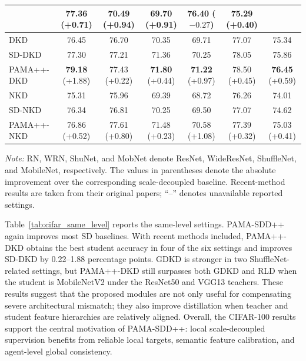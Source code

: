 \documentclass[a4paper,fleqn]{cas-dc}
\begin{document}
\begin{table}[pos=t]
{\begin{tabular}{lcccccc}
         & 77.36 {\scriptsize (+0.71)} 
         & 70.49 {\scriptsize (+0.94)} 
         & 69.70 {\scriptsize (+0.91)} 
         & 76.40 {\scriptsize ($-0.27$)} 
         & 75.29 {\scriptsize (+0.40)} \\
\midrule
DKD~\cite{zhao2022decoupled}      & 76.45 & 76.70 & 70.35 & 69.71 & 77.07 & 75.34 \\
SD-DKD~\cite{wei2024scaled}   & 77.30 & 77.21 & 71.36 & 70.25 & 78.05 & 75.86 \\
PAMA++-DKD & \textbf{79.18} {\scriptsize (+1.88)} 
         & 77.43 {\scriptsize (+0.22)} 
         & \textbf{71.80} {\scriptsize (+0.44)} 
         & \textbf{71.22} {\scriptsize (+0.97)} 
         & 78.50 {\scriptsize (+0.45)} 
         & \textbf{76.45} {\scriptsize (+0.59)} \\
\midrule
NKD~\cite{yang2023knowledge}      & 75.31 & 75.96 & 69.39 & 68.72 & 76.26 & 74.01 \\
SD-NKD~\cite{wei2024scaled}   & 76.34 & 76.81 & 70.25 & 69.50 & 77.07 & 74.62 \\
PAMA++-NKD & 76.86 {\scriptsize (+0.52)} 
         & 77.61 {\scriptsize (+0.80)} 
         & 71.48 {\scriptsize (+0.23)} 
         & 70.58 {\scriptsize (+1.08)} 
         & 77.39 {\scriptsize (+0.32)} 
         & 75.03 {\scriptsize (+0.41)} \\
\bottomrule
\end{tabular}
}
\vspace{2pt}
\begin{minipage}{0.98\textwidth}
\footnotesize
\textit{Note:} RN, WRN, ShuNet, and MobNet denote ResNet, WideResNet, ShuffleNet, and MobileNet, respectively. The values in parentheses denote the absolute improvement over the corresponding scale-decoupled baseline. Recent-method results are taken from their original papers; ``--'' denotes unavailable reported settings.
\end{minipage}
\end{table}

Table~\ref{tab:cifar_same_level} reports the same-level settings. PAMA-SDD++
again improves most SD baselines. With recent methods included, PAMA++-DKD
obtains the best student accuracy in four of the six settings and improves
SD-DKD by 0.22--1.88 percentage points. GDKD is stronger in two
ShuffleNet-related settings, but PAMA++-DKD still surpasses both GDKD and RLD
when the student is MobileNetV2 under the ResNet50 and VGG13 teachers. These
results suggest that the proposed
modules are not only useful for compensating severe architectural mismatch;
they also improve distillation when teacher and student feature hierarchies
are relatively aligned. Overall, the CIFAR-100 results support the central
motivation of PAMA-SDD++: local scale-decoupled supervision benefits from
reliable local targets, semantic feature calibration, and agent-level global
consistency.
\end{document}
